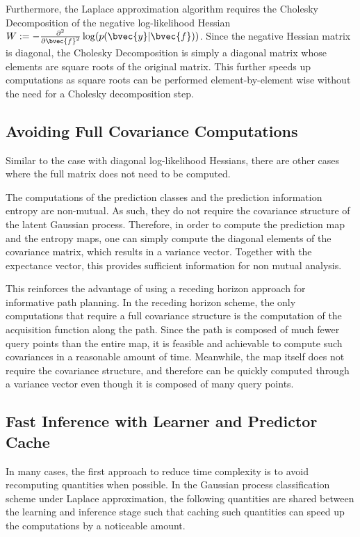 			Furthermore, the Laplace approximation algorithm requires the Cholesky Decomposition of the negative log-likelihood Hessian $W := -\frac{\partial^{2}}{{\partial \bvec{f}}^{2}} \log(p(\bvec{y} | \bvec{f}))$. Since the negative Hessian matrix is diagonal, the Cholesky Decomposition is simply a diagonal matrix whose elements are square roots of the original matrix. This further speeds up computations as square roots can be performed element-by-element wise without the need for a Cholesky decomposition step.
			
		\subsection{Avoiding Full Covariance Computations}
		\label{Appendix:ComputationalAspects:TimeSpaceComplexity:CovarianceAvoidance}
		
			Similar to the case with diagonal log-likelihood Hessians, there are other cases where the full matrix does not need to be computed. 
			
			The computations of the prediction classes and the prediction information entropy are non-mutual. As such, they do not require the covariance structure of the latent Gaussian process. Therefore, in order to compute the prediction map and the entropy maps, one can simply compute the diagonal elements of the covariance matrix, which results in a variance vector. Together with the expectance vector, this provides sufficient information for non mutual analysis.
			
			This reinforces the advantage of using a receding horizon approach for informative path planning. In the receding horizon scheme, the only computations that require a full covariance structure is the computation of the acquisition function along the path. Since the path is composed of much fewer query points than the entire map, it is feasible and achievable to compute such covariances in a reasonable amount of time. Meanwhile, the map itself does not require the covariance structure, and therefore can be quickly computed through a variance vector even though it is composed of many query points.
	
		\subsection{Fast Inference with Learner and Predictor Cache}
		\label{Appendix:ComputationalAspects:TimeSpaceComplexity:Cache}
		
			In many cases, the first approach to reduce time complexity is to avoid recomputing quantities when possible. In the Gaussian process classification scheme under Laplace approximation, the following quantities are shared between the learning and inference stage such that caching such quantities can speed up the computations by a noticeable amount.
			
